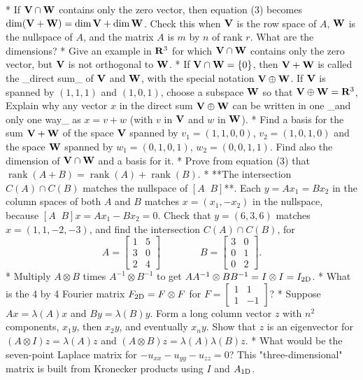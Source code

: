 * If \({\bf V}\cap{\bf W}\) contains only the zero vector, then equation (3) becomes \(\dim({\bf V}+{\bf W})=\dim{\bf V}+\dim{\bf W}\). Check this when \({\bf V}\) is the row space of \(A\), \({\bf W}\) is the nullspace of \(A\), and the matrix \(A\) is \(m\) by \(n\) of rank \(r\). What are the dimensions?
* Give an example in \({\bf R}^{3}\) for which \({\bf V}\cap{\bf W}\) contains only the zero vector, but \({\bf V}\) is not orthogonal to \({\bf W}\).
* If \({\bf V}\cap{\bf W}=\{0\}\), then \({\bf V}+{\bf W}\) is called the _direct sum_ of \({\bf V}\) and \({\bf W}\), with the special notation \({\bf V}\oplus{\bf W}\). If \({\bf V}\) is spanned by \((1,1,1)\) and \((1,0,1)\), choose a subspace \({\bf W}\) so that \({\bf V}\oplus{\bf W}={\bf R}^{3}\), Explain why any vector \(x\) in the direct sum \({\bf V}\oplus{\bf W}\) can be written in one _and only one way_ as \(x=v+w\) (with \(v\) in \({\bf V}\) and \(w\) in \({\bf W}\)).
* Find a basis for the sum \({\bf V}+{\bf W}\) of the space \({\bf V}\) spanned by \(v_{1}=(1,1,0,0)\), \(v_{2}=(1,0,1,0)\) and the space \({\bf W}\) spanned by \(w_{1}=(0,1,0,1)\), \(w_{2}=(0,0,1,1)\). Find also the dimension of \({\bf V}\cap{\bf W}\) and a basis for it.
* Prove from equation (3) that \(\operatorname{rank}(A+B)=\operatorname{rank}(A)+\operatorname{rank}(B)\).
* **The intersection \(C(A)\cap C(B)\) matches the nullspace of \([A\;\;B]\)**. Each \(y=Ax_{1}=Bx_{2}\) in the column spaces of both \(A\) and \(B\) matches \(x=(x_{1},-x_{2})\) in the nullspace, because \([A\;\;B]x=Ax_{1}-Bx_{2}=0\). Check that \(y=(6,3,6)\) matches \(x=(1,1,-2,-3)\), and find the intersection \(C(A)\cap C(B)\), for \[A=\begin{bmatrix}1&5\\ 3&0\\ 2&4\end{bmatrix}\qquad\qquad B=\begin{bmatrix}3&0\\ 0&1\\ 0&2\end{bmatrix}.\]
* Multiply \(A\otimes B\) times \(A^{-1}\otimes B^{-1}\) to get \(AA^{-1}\otimes BB^{-1}=I\otimes I=I_{\rm 2D}\).
* What is the 4 by 4 Fourier matrix \(F_{\rm 2D}=F\otimes F\) for \(F=\begin{bmatrix}1&1\\ 1&-1\end{bmatrix}\)?
* Suppose \(Ax=\lambda(A)x\) and \(By=\lambda(B)y\). Form a long column vector \(z\) with \(n^{2}\) components, \(x_{1}y\), then \(x_{2}y\), and eventually \(x_{n}y\). Show that \(z\) is an eigenvector for \((A\otimes I)z=\lambda(A)z\) and \((A\otimes B)z=\lambda(A)\lambda(B)z\).
* What would be the seven-point Laplace matrix for \(-u_{xx}-u_{yy}-u_{zz}=0\)? This "three-dimensional" matrix is built from Kronecker products using \(I\) and \(A_{\rm 1D}\).

 
